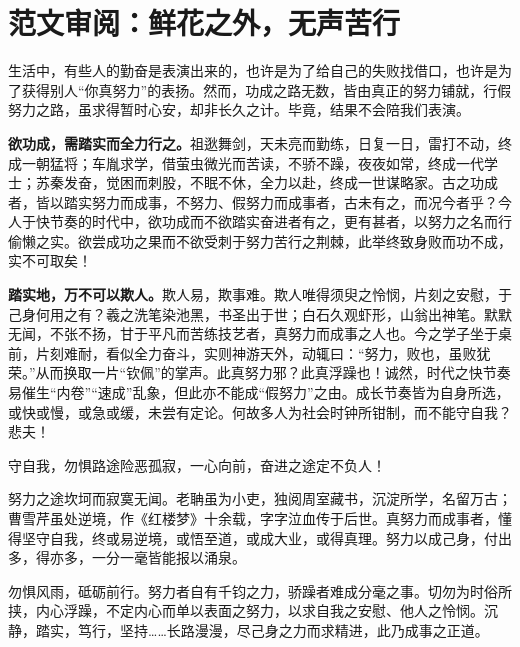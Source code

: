 \clearpage
\section*{范文审阅：鲜花之外，无声苦行}

生活中，有些人的勤奋是表演出来的，也许是为了给自己的失败找借口，也许是为了获得别人“你真努力”的表扬。然而，功成之路无数，皆由真正的努力铺就，行假努力之路，虽求得暂时心安，却非长久之计。毕竟，结果不会陪我们表演。

\textbf{欲功成，需踏实而全力行之。}祖逖舞剑，天未亮而勤练，日复一日，雷打不动，终成一朝猛将；车胤求学，借萤虫微光而苦读，不骄不躁，夜夜如常，终成一代学士；苏秦发奋，觉困而刺股，不眠不休，全力以赴，终成一世谋略家。古之功成者，皆以踏实努力而成事，不努力、假努力而成事者，古未有之，而况今者乎？今人于快节奏的时代中，欲功成而不欲踏实奋进者有之，更有甚者，以努力之名而行偷懒之实。欲尝成功之果而不欲受刺于努力苦行之荆棘，此举终致身败而功不成，实不可取矣！

\textbf{踏实地，万不可以欺人。}欺人易，欺事难。欺人唯得须臾之怜悯，片刻之安慰，于己身何用之有？羲之洗笔染池黑，书圣出于世；白石久观虾形，山翁出神笔。默默无闻，不张不扬，甘于平凡而苦练技艺者，真努力而成事之人也。今之学子坐于桌前，片刻难耐，看似全力奋斗，实则神游天外，动辄曰：“努力，败也，虽败犹荣。”从而换取一片“钦佩”的掌声。此真努力邪？此真浮躁也！诚然，时代之快节奏易催生“内卷”“速成”乱象，但此亦不能成“假努力”之由。成长节奏皆为自身所选，或快或慢，或急或缓，未尝有定论。何故多人为社会时钟所钳制，而不能守自我？悲夫！

守自我，勿惧路途险恶孤寂，一心向前，奋进之途定不负人！

努力之途坎坷而寂寞无闻。老聃虽为小吏，独阅周室藏书，沉淀所学，名留万古；曹雪芹虽处逆境，作《红楼梦》十余载，字字泣血传于后世。真努力而成事者，懂得坚守自我，终或易逆境，或悟至道，或成大业，或得真理。努力以成己身，付出多，得亦多，一分一毫皆能报以涌泉。

勿惧风雨，砥砺前行。努力者自有千钧之力，骄躁者难成分毫之事。切勿为时俗所挟，内心浮躁，不定内心而单以表面之努力，以求自我之安慰、他人之怜悯。沉静，踏实，笃行，坚持……长路漫漫，尽己身之力而求精进，此乃成事之正道。



